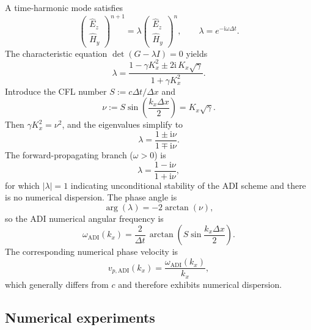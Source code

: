 \documentclass{article}
\numberwithin{equation}{section}
\numberwithin{figure}{section}
\begin{document}
A time-harmonic mode satisfies
\begin{equation}
    \begin{pmatrix}\widehat E_z\\\widehat H_y\end{pmatrix}^{n+1}=\lambda\begin{pmatrix}\widehat E_z\\\widehat H_y\end{pmatrix}^{n},\qquad \lambda=e^{-\mathrm{i}\omega\Delta t}.
\end{equation}
The characteristic equation $\det(G-\lambda I)=0$ yields
\begin{equation}
    \lambda = \frac{1-\gamma K_x^2\pm 2\mathrm{i}\,K_x\sqrt{\gamma}}{1+\gamma K_x^2}.
\end{equation}
Introduce the CFL number $S:=c\Delta t/\Delta x$ and
\begin{equation}
    \nu := S\sin\!\left(\frac{k_x\Delta x}{2}\right) = K_x\sqrt{\gamma}.
\end{equation}
Then $\gamma K_x^2=\nu^2$, and the eigenvalues simplify to
\begin{equation}
    \lambda = \frac{1\pm\mathrm{i}\nu}{1\mp\mathrm{i}\nu}.
\end{equation}
The forward-propagating branch ($\omega>0$) is
\begin{equation}
    \lambda = \frac{1-\mathrm{i}\nu}{1+\mathrm{i}\nu},
\end{equation}
for which $\lvert\lambda\rvert=1$ indicating unconditional stability of the ADI scheme and there is no numerical dispersion. The phase angle is
\begin{equation}
    \arg(\lambda)=-2\arctan(\nu),
\end{equation}
so the ADI numerical angular frequency is
\begin{equation}
    \omega_{\mathrm{ADI}}(k_x) = \frac{2}{\Delta t}\,\arctan\!\left(S\sin\frac{k_x\Delta x}{2}\right).
    \label{eq:adi-dispersion-relation}
\end{equation}
The corresponding numerical phase velocity is
\begin{equation}
    v_{p,\mathrm{ADI}}(k_x)=\frac{\omega_{\mathrm{ADI}}(k_x)}{k_x},
\end{equation}
which generally differs from $c$ and therefore exhibits numerical dispersion.

\subsection{Numerical experiments}
\end{document}
